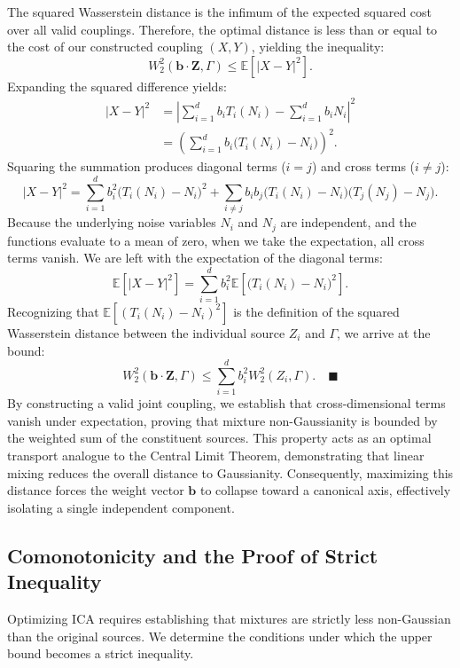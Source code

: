 \documentclass[12pt,a4paper,twoside,openany]{book}
\begin{document}
The squared Wasserstein distance is the infimum of the expected squared cost over all valid couplings. 
Therefore, the optimal distance is less than or equal to the cost of our constructed coupling $(X, Y)$, yielding the inequality:
\begin{equation}
    W_2^2(\mathbf{b} \cdot \mathbf{Z}, \Gamma) \le \mathbb{E}\left[|X - Y|^2\right].
\end{equation}
Expanding the squared difference yields:
\begin{align}
    |X - Y|^2 &= \left| \sum_{i=1}^d b_i T_i(N_i) - \sum_{i=1}^d b_i N_i \right|^2 \nonumber \\
              &= \left( \sum_{i=1}^d b_i \big(T_i(N_i) - N_i\big) \right)^2.
\end{align}
Squaring the summation produces diagonal terms ($i=j$) and cross terms ($i \neq j$):
\begin{equation}
    |X - Y|^2 = \sum_{i=1}^d b_i^2 \big(T_i(N_i) - N_i\big)^2 + \sum_{i \neq j} b_i b_j \big(T_i(N_i) - N_i\big)\big(T_j(N_j) - N_j\big).
\end{equation}
Because the underlying noise variables $N_i$ and $N_j$ are independent, 
and the functions evaluate to a mean of zero, when we take the expectation, all cross terms vanish. We are left with the expectation of the diagonal terms:
\begin{equation}
    \mathbb{E}\left[|X - Y|^2\right] = \sum_{i=1}^d b_i^2 \mathbb{E}\left[ \big(T_i(N_i) - N_i\big)^2 \right].
\end{equation}
Recognizing that $\mathbb{E}[ (T_i(N_i) - N_i)^2 ]$ is the definition of the squared Wasserstein distance between 
the individual source $Z_i$ and $\Gamma$, we arrive at the bound:
\begin{equation}
    W_2^2(\mathbf{b} \cdot \mathbf{Z}, \Gamma) \le \sum_{i=1}^d b_i^2 W_2^2(Z_i, \Gamma). \quad \blacksquare
\end{equation}
By constructing a valid joint coupling, we establish that cross-dimensional terms vanish under expectation, 
proving that mixture non-Gaussianity is bounded by the weighted sum of the constituent sources. 
This property acts as an optimal transport analogue to the Central Limit Theorem, demonstrating that linear mixing 
reduces the overall distance to Gaussianity. Consequently, maximizing this distance forces the weight vector $\mathbf{b}$ to collapse toward a canonical axis, 
effectively isolating a single independent component.

\subsection{Comonotonicity and the Proof of Strict Inequality}
Optimizing ICA requires establishing that mixtures are strictly less non-Gaussian than the original sources. 
We determine the conditions under which the upper bound becomes a strict inequality.
\end{document}
